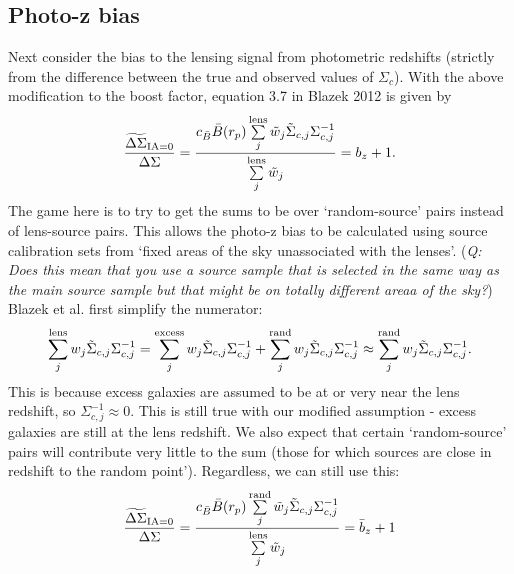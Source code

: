 \documentclass[onecolumn,amsmath,aps,fleqn, superscriptaddress]{revtex4}
\begin{document}
\subsection*{Photo-z bias}
Next consider the bias to the lensing signal from photometric redshifts (strictly from the difference between the true and observed values of $\Sigma_c$). With the above modification to the boost factor, equation 3.7 in Blazek 2012 is given by
\begin{equation}
\frac{\widetilde{\Delta \Sigma}_{\rm IA = 0}}{\Delta \Sigma} = \frac{c_{\bar B} \bar{B}(r_p) \sum\limits^{\rm lens}_{j} \tilde{w}_j \tilde{\Sigma}_{c,j} \Sigma_{c,j}^{-1}}{\sum\limits^{\rm lens}_{j} \tilde{w}_j} = b_z+1.
\label{update3pt7}
\end{equation}
The game here is to try to get the sums to be over `random-source' pairs instead of lens-source pairs. This allows the photo-z bias to be calculated using source calibration sets from `fixed areas of the sky unassociated with the lenses'. ({\it Q: Does this mean that you use a source sample that is selected in the same way as the main source sample but that might be on totally different areaa of the sky?}) Blazek et al. first simplify the numerator:
\begin{equation}
\sum\limits_{j}^{\rm lens} w_j \tilde{\Sigma}_{c,j} \Sigma_{c,j}^{-1} = \sum\limits_{j}^{\rm excess} w_j \tilde{\Sigma}_{c,j} \Sigma_{c,j}^{-1} + \sum\limits_{j}^{\rm rand} w_j \tilde{\Sigma}_{c,j} \Sigma_{c,j}^{-1} \approx \sum\limits_{j}^{\rm rand} w_j \tilde{\Sigma}_{c,j} \Sigma_{c,j}^{-1}.
\label{split}
\end{equation}
This is because excess galaxies are assumed to be at or very near the lens redshift, so $\Sigma_{c,j}^{-1}\approx0$. This is still true with our modified assumption - excess galaxies are still at the lens redshift. We also expect that certain `random-source' pairs will contribute very little to the sum (those for which sources are close in redshift to the random point'). Regardless, we can still use this:
\begin{equation}
\frac{\widetilde{\Delta \Sigma}_{\rm IA = 0}}{\Delta \Sigma} = \frac{c_{\bar B} \bar{B}(r_p) \sum\limits^{\rm rand}_{j} \tilde{w}_j \tilde{\Sigma}_{c,j} \Sigma_{c,j}^{-1}}{\sum\limits^{\rm lens}_{j} \tilde{w}_j} = \bar{b}_z+1
\label{update3pt7v2}
\end{equation}
\end{document}
